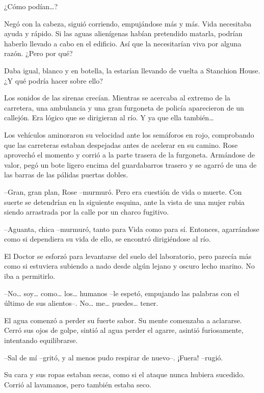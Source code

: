 {¿Cómo podían\ldots{}?}

{Negó con la cabeza, siguió corriendo, empujándose más y más. Vida
 necesitaba ayuda y rápido. Si las aguas alienígenas habían pretendido
 matarla, podrían haberlo llevado a cabo en el edificio. Así que la
necesitarían viva por alguna razón. ¿Pero por qué?}

{Daba igual, blanco y en botella, la estarían llevando de vuelta a
Stanchion House. ¿Y qué podría hacer sobre ello?}

{Los sonidos de las sirenas crecían. Mientras se acercaba al extremo de
 la carretera, una ambulancia y una gran furgoneta de policía aparecieron
 de un callejón. Era lógico que se dirigieran al río. Y ya que ella
 también\ldots{}}

{Los vehículos aminoraron su velocidad ante los semáforos en rojo,
 comprobando que las carreteras estaban despejadas antes de acelerar en
 su camino. Rose aprovechó el momento y corrió a la parte trasera de la
 furgoneta. Armándose de valor, pegó un bote ligero encima del
 guardabarros trasero y se agarró de una de las barras de las pálidas
puertas dobles.}

{--Gran, gran plan, Rose --murmuró. Pero era cuestión de vida o muerte.
 Con suerte se detendrían en la siguiente esquina, ante la vista de una
mujer rubia siendo arrastrada por la calle por un charco fugitivo.}

{--Aguanta, chica --murmuró, tanto para Vida como para sí. Entonces,
 agarrándose como si dependiera su vida de ello, se encontró dirigiéndose
al río.}

\mbox{}

{El Doctor se esforzó para levantarse del suelo del laboratorio, pero
 parecía más como si estuviera subiendo a nado desde algún lejano y
oscuro lecho marino. No iba a permitirlo.}

{--No\ldots{} soy\ldots{} como\ldots{} los\ldots{} humanos --le espetó,
 empujando las palabras con el último de sus alientos--. No\ldots{}
 me\ldots{} puedes\ldots{} tener.}

{El agua comenzó a perder su fuerte sabor. Su mente comenzaba a
 aclararse. Cerró sus ojos de golpe, sintió al agua perder el agarre,
asintió furiosamente, intentando equilibrarse.}

{--Sal de mí --gritó, y al menos pudo respirar de nuevo--. ¡Fuera!
--rugió.}

{Su cara y sus ropas estaban secas, como si el ataque nunca hubiera
sucedido. Corrió al lavamanos, pero también estaba seco.}

